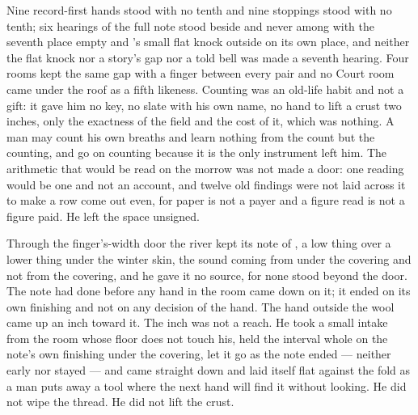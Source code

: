 Nine record-first hands stood with no tenth and nine stoppings stood with no tenth; six hearings of the full note stood beside and never among with the seventh place empty and 's small flat knock outside on its own place, and neither the flat knock nor a story's gap nor a told bell was made a seventh hearing. Four rooms kept the same gap with a finger between every pair and no Court room came under the roof as a fifth likeness. Counting was an old-life habit and not a gift: it gave him no key, no slate with his own name, no hand to lift a crust two inches, only the exactness of the field and the cost of it, which was nothing. A man may count his own breaths and learn nothing from the count but the counting, and go on counting because it is the only instrument left him. The arithmetic that would be read on the morrow was not made a door: one reading would be one and not an account, and twelve old findings were not laid across it to make a row come out even, for paper is not a payer and a figure read is not a figure paid. He left the space unsigned.

Through the finger's-width door the river kept its note of , a low thing over a lower thing under the winter skin, the sound coming from under the covering and not from the covering, and he gave it no source, for none stood beyond the door. The note had done before any hand in the room came down on it; it ended on its own finishing and not on any decision of the hand. The hand outside the wool came up an inch toward it. The inch was not a reach. He took a small intake from the room whose floor does not touch his, held the interval whole on the note's own finishing under the covering, let it go as the note ended --- neither early nor stayed --- and came straight down and laid itself flat against the fold as a man puts away a tool where the next hand will find it without looking. He did not wipe the thread. He did not lift the crust.

